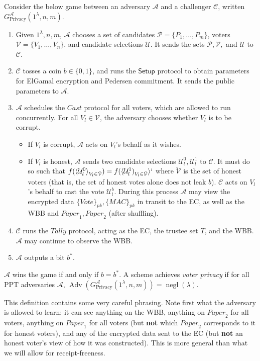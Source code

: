 \documentclass[12pt,a4paper]{article}
\DeclareMathOperator{\negl}{\text{negl}}
\DeclareMathOperator{\Adv}{\text{Adv}}
\theoremstyle{definition}
\newcommand{\Vote}{\mathit{Vote}}
\newcommand{\Paper}{\mathit{Paper}}
\newcommand{\Mac}{\mathit{MAC}}
\newcounter{protocol}
\begin{document}
\begin{definition}
    Consider the below game between an adversary $\mathcal{A}$ and a challenger $\mathcal{C}$, written $G^\mathcal{A}_{\text{Privacy}}(1^\lambda, n, m)$.
    \begin{enumerate}
        \item Given $1^\lambda, n, m$, $\mathcal{A}$ chooses a set of candidates $\mathcal{P}=\{P_1,\ldots,P_m\}$, voters $\mathcal{V}=\{V_1,\ldots,V_n\}$, and candidate selections $\mathcal{U}$. It sends the sets $\mathcal{P}, \mathcal{V},$ and $\mathcal{U}$ to $\mathcal{C}$.
        \item $\mathcal{C}$ tosses a coin $b\in\{0, 1\}$, and runs the $\mathsf{Setup}$ protocol to obtain parameters for ElGamal encryption and Pedersen commitment. It sends the public parameters to $\mathcal{A}$.
        \item $\mathcal{A}$ schedules the $\mathit{Cast}$ protocol for all voters, which are allowed to run concurrently. For all $V_l\in\mathcal{V}$, the adversary chooses whether $V_l$ is to be corrupt.
        \begin{itemize}
            \item If $V_l$ is corrupt, $\mathcal{A}$ acts on $V_l$'s behalf as it wishes.
            \item If $V_l$ is honest, $\mathcal{A}$ sends two candidate selections $\mathcal{U}_l^0, \mathcal{U}_l^1$ to $\mathcal{C}$. It must do so such that $f(\langle\mathcal{U}_l^0\rangle_{V_l\in \tilde{\mathcal{V}}})=f(\langle\mathcal{U}^1_l)_{V_l\in \tilde{\mathcal{V}}}\rangle`$ where $\tilde{\mathcal{V}}$ is the set of honest voters (that is, the set of honest votes alone does not leak $b$). $\mathcal{C}$ acts on $V_l$'s behalf to cast the vote $\mathcal{U}_l^b$. During this process $\mathcal{A}$ may view the encrypted data $\{\Vote\}_{\mathit{pk}}, \{\Mac\}_{\mathit{pk}}$ in transit to the EC, as well as the WBB and $\Paper_1, \Paper_2$ (after shuffling).
        \end{itemize}
        \item $\mathcal{C}$ runs the $\mathit{Tally}$ protocol, acting as the EC, the trustee set $T$, and the WBB. $\mathcal{A}$ may continue to observe the WBB.
        \item $\mathcal{A}$ outputs a bit $b^*$.
    \end{enumerate}
    $\mathcal{A}$ wins the game if and only if $b=b^*$. A scheme achieves \textit{voter privacy} if for all PPT adversaries $\mathcal{A}$, $\Adv\left(G^\mathcal{A}_{\text{Privacy}}(1^\lambda, n, m)\right)=\negl(\lambda)$.
\end{definition}
This definition contains some very careful phrasing. Note first what the adversary is allowed to learn: it can see anything on the WBB, anything on $\Paper_2$ for all voters, anything on $\Paper_1$ for all voters (but \textbf{not} which $\Paper_2$ corresponds to it for honest voters), and any of the encrypted data sent to the EC (but \textbf{not} an honest voter's view of how it was constructed). This is more general than what we will allow for receipt-freeness.
\end{document}
